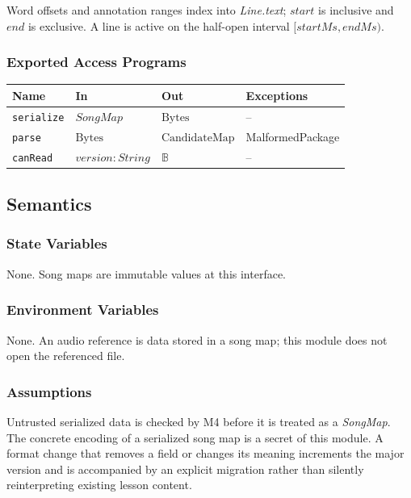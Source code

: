 \documentclass[12pt, titlepage]{article}
\begin{document}
Word offsets and annotation ranges index into \textit{Line.text}; $start$ is
inclusive and $end$ is exclusive.  A line is active on the half-open interval
$[startMs,endMs)$.

\subsubsection{Exported Access Programs}

\begin{center}
\begin{tabularx}{\textwidth}{p{2.8cm} X X p{2.8cm}}
\toprule
\textbf{Name} & \textbf{In} & \textbf{Out} & \textbf{Exceptions} \\
\midrule
\texttt{serialize} & $SongMap$ & $\mathrm{Bytes}$ & -- \\
\texttt{parse} & $\mathrm{Bytes}$ & $\mathrm{CandidateMap}$ &
MalformedPackage \\
\texttt{canRead} & $version: String$ & $\mathbb{B}$ & -- \\
\bottomrule
\end{tabularx}
\end{center}

\subsection{Semantics}

\subsubsection{State Variables}

None.  Song maps are immutable values at this interface.

\subsubsection{Environment Variables}

None.  An audio reference is data stored in a song map; this module does not
open the referenced file.

\subsubsection{Assumptions}

Untrusted serialized data is checked by M4 before it is treated as a
\textit{SongMap}.  The concrete encoding of a serialized song map is a secret
of this module.  A format change that removes a field or changes its meaning
increments the major version and is accompanied by an explicit migration rather
than silently reinterpreting existing lesson content.
\end{document}
